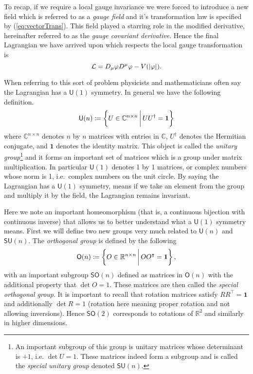 To recap, if we require a local gauge invariance we were forced to introduce a
new field which is referred to as a \textit{gauge field} and it's transformation
law is specified by (\ref{eq:vectorTrans}). This field played a starring role in
the modified derivative, hereinafter referred to as the \textit{gauge covariant
derivative}. Hence the final Lagrangian we have arrived upon which respects the
local gauge transformation is
\begin{equation}\label{eq:covLag}
    \mathcal{L} = D_\mu\varphi D^\mu\varphi - V(|\varphi|).
\end{equation}

When referring to this sort of problem physicists and mathematicians often say
the Lagrangian has a \(\mathsf{U}(1)\) symmetry. In general we have the
following definition.
\begin{equation}\label{eq:unitaryG}
    \mathsf{U}(n)\coloneqq\left\{U\in\mathbb{C}^{n\times n} \, \bigg{|} \, UU^\dagger = \mathbf{1}\right\}
\end{equation}
where \(\mathbb{C}^{n\times n}\) denotes \(n\) by \(n\) matrices with entries in
\(\mathbb{C}\), \(U^\dagger\) denotes the Hermitian conjugate, and \(\mathbf{1}\)
denotes the identity matrix. This object is called the
\textit{unitary group}\footnote{An important subgroup of this group is unitary
matrices whose determinant is \(+1\), i.e. \(\det U = 1\). These matrices indeed
form a subgroup and is called the \textit{special unitary group} denoted
\(\mathsf{SU}(n)\).} and it forms an important set of matrices which is a group
under matrix multiplication. In particular \(\mathsf{U}(1)\) denotes 1 by 1
matrices, or complex numbers whose norm is 1, i.e.\ complex numbers on the unit
circle. By saying the Lagrangian has a \(\mathsf{U}(1)\) symmetry, means if we
take an element from the group and multiply it by the field, the Lagrangian
remains invariant.

Here we note an important homeomorphism (that is, a continuous bijection with
continuous inverse) that allows us to better understand what a \(\mathsf{U}(1)\)
symmetry means. First we will define two new groups very much related to
\(\mathsf{U}(n)\) and \(\mathsf{SU}(n)\). The \textit{orthogonal group} is
defined by the following
\begin{equation}
    \mathsf{O}(n)\coloneqq\left\{O\in\mathbb{R}^{n\times n}\,\bigg{|}\,OO^\intercal = \mathbf{1}\right\},
\end{equation}
with an important subgroup \(\mathsf{SO}(n)\) defined as matrices in
\(\mathsf{O}(n)\) with the additional property that \(\det O = 1\). These
matrices are then called the \textit{special orthogonal group}. It is important
to recall that rotation matrices satisfy \(RR^{\intercal} = \mathbf{1}\) and
additionally \(\det R = 1\) (rotation here meaning proper rotation and not
allowing inversions). Hence \(\mathsf{SO}(2)\) corresponds to rotations of
\(\mathbb{R}^2\) and similarly in higher dimensions.

